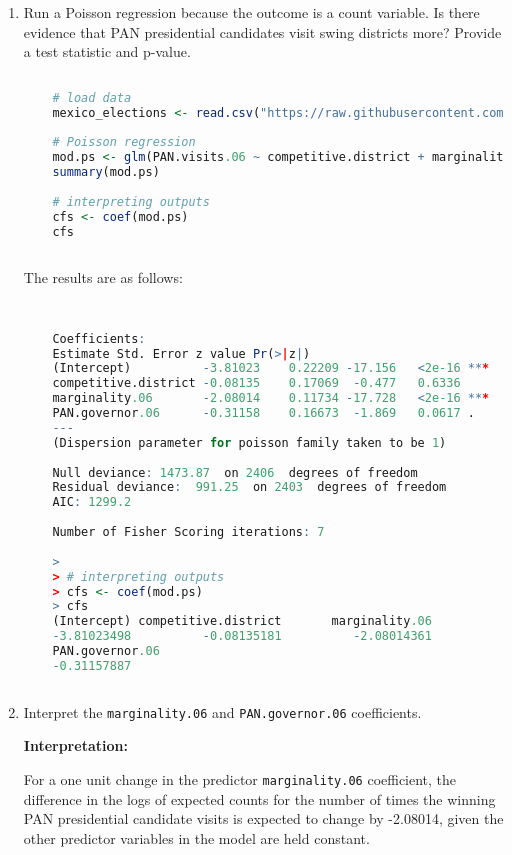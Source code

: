 \documentclass[12pt,letterpaper]{article}
\begin{document}
\begin{enumerate}
	\item [(a)]
	Run a Poisson regression because the outcome is a count variable. Is there evidence that PAN presidential candidates visit swing districts more? Provide a test statistic and p-value.
	
	\begin{lstlisting}[language=R]
	
	# load data
	mexico_elections <- read.csv("https://raw.githubusercontent.com/ASDS-TCD/StatsII_Spring2024/main/datasets/MexicoMuniData.csv")
	
	# Poisson regression
	mod.ps <- glm(PAN.visits.06 ~ competitive.district + marginality.06 + PAN.governor.06, data = mexico_elections, family = poisson)
	summary(mod.ps)
	
	# interpreting outputs
	cfs <- coef(mod.ps)
	cfs
	
	\end{lstlisting}

	The results are as follows:
	
	\begin{lstlisting}[language=R]
	
	
	Coefficients:
	Estimate Std. Error z value Pr(>|z|)    
	(Intercept)          -3.81023    0.22209 -17.156   <2e-16 ***
	competitive.district -0.08135    0.17069  -0.477   0.6336    
	marginality.06       -2.08014    0.11734 -17.728   <2e-16 ***
	PAN.governor.06      -0.31158    0.16673  -1.869   0.0617 .  
	---
	(Dispersion parameter for poisson family taken to be 1)
	
	Null deviance: 1473.87  on 2406  degrees of freedom
	Residual deviance:  991.25  on 2403  degrees of freedom
	AIC: 1299.2
	
	Number of Fisher Scoring iterations: 7
	
	> 
	> # interpreting outputs
	> cfs <- coef(mod.ps)
	> cfs
	(Intercept) competitive.district       marginality.06 
	-3.81023498          -0.08135181          -2.08014361 
	PAN.governor.06 
	-0.31157887 
	
	\end{lstlisting}
		
	\item [(b)]
	Interpret the \texttt{marginality.06} and \texttt{PAN.governor.06} coefficients.
	
\textbf{	Interpretation:}  

For a one unit change in the predictor \texttt{marginality.06} coefficient, the difference in the logs of expected counts for the number of times the winning PAN presidential candidate visits is expected to change by -2.08014, given the other predictor variables in the model are held constant.


\end{enumerate}
\end{document}
